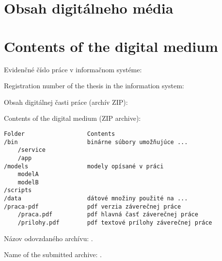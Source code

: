 \thispagestyle{empty}

\ifx\FIITlagEN\undefined
\chapter{Obsah digitálneho média}
\else
\chapter{Contents of the digital medium}
\fi

\renewcommand*{\thepage}{C-\arabic{page}}

\ifx\FIITlagEN\undefined
\par Evidenčné číslo práce v informačnom systéme: \FIITevidenceNumber
\else
\par Registration number of the thesis in the information system: \FIITevidenceNumber
\fi

\ifx\FIITlagEN\undefined
\par Obsah digitálnej časti práce (archív ZIP):
\else
\par Contents of the digital medium (ZIP archive):
\fi

\begin{verbatim}
Folder                  Contents
/bin                    binárne súbory umožňujúce ...
    /service
    /app
/models                 modely opísané v práci
    modelA
    modelB
/scripts
/data                   dátové množiny použité na ...
/praca-pdf              pdf verzia záverečnej práce
    /praca.pdf          pdf hlavná časť záverečnej práce
    /prilohy.pdf        pdf textové prílohy záverečnej práce

\end{verbatim}



\ifx\FIITlagEN\undefined
\par Názov odovzdaného archívu: \FIITArchiveName.
\else
\par Name of the submitted archive: \FIITArchiveName.
\fi
